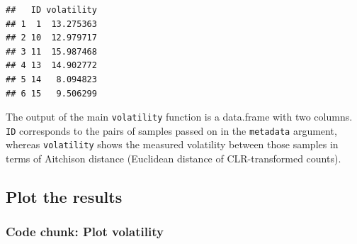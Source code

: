 \documentclass[
]{article}
\begin{document}
\begin{verbatim}
##   ID volatility
## 1  1  13.275363
## 2 10  12.979717
## 3 11  15.987468
## 4 13  14.902772
## 5 14   8.094823
## 6 15   9.506299
\end{verbatim}

The output of the main \texttt{volatility} function is a data.frame with
two columns. \texttt{ID} corresponds to the pairs of samples passed on
in the \texttt{metadata} argument, whereas \texttt{volatility} shows the
measured volatility between those samples in terms of Aitchison distance
(Euclidean distance of CLR-transformed counts).

\newpage

\hypertarget{plot-the-results-1}{%
\subsection{Plot the results}\label{plot-the-results-1}}

\hypertarget{code-chunk-plot-volatility}{%
\subsubsection{Code chunk: Plot
volatility}\label{code-chunk-plot-volatility}}
\end{document}
